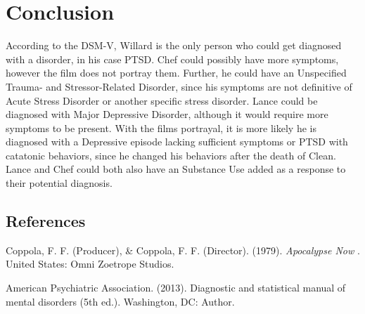 \documentclass[a4paper,man,natbib]{apa6}
\begin{document}
\section{Conclusion}	

According to the DSM-V, Willard is the only person who could get diagnosed with a disorder, in his case PTSD. Chef could possibly have more symptoms, however the film does not portray them. Further, he could have an Unspecified Trauma- and
Stressor-Related Disorder, since his symptoms are not definitive of Acute Stress Disorder or another specific stress disorder. Lance could be diagnosed with Major Depressive Disorder, although it would require more symptoms to be present. With the films portrayal, it is more likely he is diagnosed with a Depressive episode lacking sufficient symptoms or PTSD with catatonic behaviors, since he changed his behaviors after the death of Clean. Lance and Chef could both also have an Substance Use added as a response to their potential diagnosis. \\

\raggedbottom
\pagebreak
\subsection{References}

\noindent Coppola, F. F. (Producer), \& Coppola, F. F. (Director). (1979). \textit{Apocalypse Now}
. United States: Omni Zoetrope Studios.

\noindent American Psychiatric Association. (2013). Diagnostic and statistical manual of mental
\indent disorders (5th ed.). Washington, DC: Author.
\end{document}
